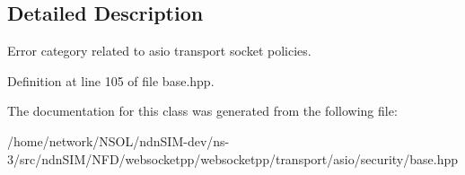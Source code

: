 \subsection{Detailed Description}
Error category related to asio transport socket policies. 

Definition at line 105 of file base.\+hpp.



The documentation for this class was generated from the following file\+:\begin{DoxyCompactItemize}
\item 
/home/network/\+N\+S\+O\+L/ndn\+S\+I\+M-\/dev/ns-\/3/src/ndn\+S\+I\+M/\+N\+F\+D/websocketpp/websocketpp/transport/asio/security/base.\+hpp\end{DoxyCompactItemize}
